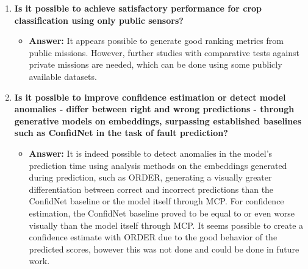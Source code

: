 \begin{enumerate}[label=\textbf{RQ\arabic*:}, leftmargin=*, parsep=1em]
    \begin{itemize}[label=$\hookrightarrow$, leftmargin=2em, topsep=0.5em]
        \item \textbf{Answer:}
        Yes, such a pipeline seems possible. The SITS download method presented shifts most of the processing cost to the server, allowing the use of cloud solutions like GEE on modest hardware. Regarding the cost of the models, although due to time and research scope constraints their memory size was not explored, all are capable of being fine-tuned on a modest GPU (in some of our tests, we used an Nvidia RTX 5070 TI 16GB). Regarding which model to choose, two stood out: SITS-BERT++ and Mamba. The former presented slightly higher metrics than the latter, which in turn shows linear processing and memory costs instead of the quadratic cost of the former, proving to be a balanced option in terms of cost metrics.
    \end{itemize}

    \item \textbf{Is it possible to achieve satisfactory performance for crop classification using only public sensors?}
    
    \begin{itemize}[label=$\hookrightarrow$, leftmargin=2em, topsep=0.5em]
        \item \textbf{Answer:}
        It appears possible to generate good ranking metrics from public missions. However, further studies with comparative tests against private missions are needed, which can be done using some publicly available datasets.
    \end{itemize}

    \item \textbf{Is it possible to improve confidence estimation or detect model anomalies - differ between right and wrong predictions - through generative models on embeddings, surpassing established baselines such as ConfidNet \citep{corbiere2019addressing} in the task of fault prediction?}
    
    \begin{itemize}[label=$\hookrightarrow$, leftmargin=2em, topsep=0.5em]
        \item \textbf{Answer:}
        It is indeed possible to detect anomalies in the model's prediction time using analysis methods on the embeddings generated during prediction, such as ORDER, generating a visually greater differentiation between correct and incorrect predictions than the ConfidNet baseline or the model itself through MCP. For confidence estimation, the ConfidNet baseline proved to be equal to or even worse visually than the model itself through MCP. It seems possible to create a confidence estimate with ORDER due to the good behavior of the predicted scores, however this was not done and could be done in future work.
    \end{itemize}

\end{enumerate}

